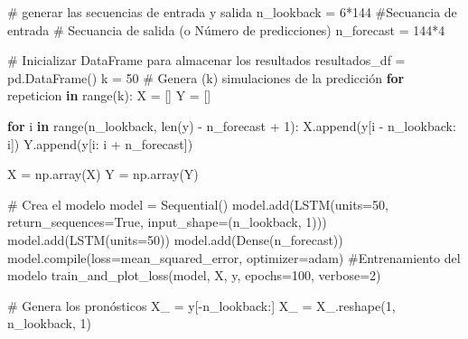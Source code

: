 \documentclass[
  us-letterpaper,
]{scrreprt}
\newenvironment{Shaded}{\begin{snugshade}}{\end{snugshade}}
\newcommand{\BuiltInTok}[1]{\textcolor[rgb]{0.00,0.23,0.31}{#1}}
\newcommand{\CommentTok}[1]{\textcolor[rgb]{0.37,0.37,0.37}{#1}}
\newcommand{\ControlFlowTok}[1]{\textcolor[rgb]{0.00,0.23,0.31}{\textbf{#1}}}
\newcommand{\DecValTok}[1]{\textcolor[rgb]{0.68,0.00,0.00}{#1}}
\newcommand{\KeywordTok}[1]{\textcolor[rgb]{0.00,0.23,0.31}{\textbf{#1}}}
\newcommand{\NormalTok}[1]{\textcolor[rgb]{0.00,0.23,0.31}{#1}}
\newcommand{\OperatorTok}[1]{\textcolor[rgb]{0.37,0.37,0.37}{#1}}
\newcommand{\StringTok}[1]{\textcolor[rgb]{0.13,0.47,0.30}{#1}}
\newcommand{\VariableTok}[1]{\textcolor[rgb]{0.07,0.07,0.07}{#1}}
\theoremstyle{plain}
\theoremstyle{definition}
\theoremstyle{definition}
\theoremstyle{remark}
\begin{document}
\begin{Shaded}
\begin{Highlighting}[]
\CommentTok{\# generar las secuencias de entrada y salida}
\NormalTok{n\_lookback }\OperatorTok{=} \DecValTok{6}\OperatorTok{*}\DecValTok{144}  \CommentTok{\#Secuancia de entrada}
\CommentTok{\# Secuancia de salida (o Número de predicciones)}
\NormalTok{n\_forecast }\OperatorTok{=} \DecValTok{144}\OperatorTok{*}\DecValTok{4} 

\CommentTok{\# Inicializar DataFrame para almacenar los resultados}
\NormalTok{resultados\_df }\OperatorTok{=}\NormalTok{ pd.DataFrame()}
\NormalTok{k }\OperatorTok{=} \DecValTok{50}
\CommentTok{\# Genera (k) simulaciones de la predicción}
\ControlFlowTok{for}\NormalTok{ repeticion }\KeywordTok{in} \BuiltInTok{range}\NormalTok{(k):}
\NormalTok{    X }\OperatorTok{=}\NormalTok{ []}
\NormalTok{    Y }\OperatorTok{=}\NormalTok{ []}

    \ControlFlowTok{for}\NormalTok{ i }\KeywordTok{in} \BuiltInTok{range}\NormalTok{(n\_lookback, }\BuiltInTok{len}\NormalTok{(y) }\OperatorTok{{-}}\NormalTok{ n\_forecast }\OperatorTok{+} \DecValTok{1}\NormalTok{):}
\NormalTok{        X.append(y[i }\OperatorTok{{-}}\NormalTok{ n\_lookback: i])}
\NormalTok{        Y.append(y[i: i }\OperatorTok{+}\NormalTok{ n\_forecast])}

\NormalTok{    X }\OperatorTok{=}\NormalTok{ np.array(X)}
\NormalTok{    Y }\OperatorTok{=}\NormalTok{ np.array(Y)}

    \CommentTok{\# Crea el modelo}
\NormalTok{    model }\OperatorTok{=}\NormalTok{ Sequential()}
\NormalTok{    model.add(LSTM(units}\OperatorTok{=}\DecValTok{50}\NormalTok{, return\_sequences}\OperatorTok{=}\VariableTok{True}\NormalTok{,}
\NormalTok{              input\_shape}\OperatorTok{=}\NormalTok{(n\_lookback, }\DecValTok{1}\NormalTok{)))}
\NormalTok{    model.add(LSTM(units}\OperatorTok{=}\DecValTok{50}\NormalTok{))}
\NormalTok{    model.add(Dense(n\_forecast))}
\NormalTok{    model.}\BuiltInTok{compile}\NormalTok{(loss}\OperatorTok{=}\StringTok{\textquotesingle{}mean\_squared\_error\textquotesingle{}}\NormalTok{, optimizer}\OperatorTok{=}\StringTok{\textquotesingle{}adam\textquotesingle{}}\NormalTok{)}
    \CommentTok{\#Entrenamiento del modelo}
\NormalTok{    train\_and\_plot\_loss(model, X, y, epochs}\OperatorTok{=}\DecValTok{100}\NormalTok{, verbose}\OperatorTok{=}\DecValTok{2}\NormalTok{)}
    

    \CommentTok{\# Genera los pronósticos}
\NormalTok{    X\_ }\OperatorTok{=}\NormalTok{ y[}\OperatorTok{{-}}\NormalTok{n\_lookback:]}
\NormalTok{    X\_ }\OperatorTok{=}\NormalTok{ X\_.reshape(}\DecValTok{1}\NormalTok{, n\_lookback, }\DecValTok{1}\NormalTok{)}


\end{Highlighting}
\end{Shaded}
\end{document}
